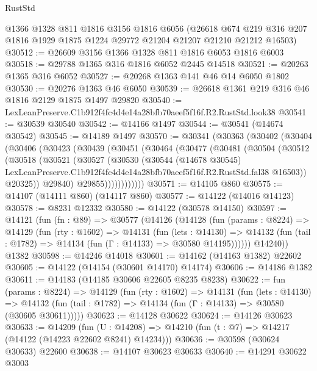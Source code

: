 \begin{lexlean}{RustStd}
\begin{coremodule}
    @1366
    @1328
    @811
    @1816
    @3156
    @1816
    @6056
    (@26618 @674 @219 @316 @207 @1816 @1929 @1875 @1224 @29772 @21204 @21207 @21210 @21212 @16503)
@30512 := @26609 @3156 @1366 @1328 @811 @1816 @6053 @1816 @6003
@30518 := @29788 @1365 @316 @1816 @6052 @2445 @14518
@30521 := @20263 @1365 @316 @6052
@30527 := @20268 @1363 @141 @46 @14 @6050 @1802
@30530 := @20276 @1363 @46 @6050
@30539 := @26618 @1361 @219 @316 @46 @1816 @2129 @1875 @1497 @29820
@30540 := LexLeanPreserve.C1b912f4fc4d4e14a28bfb70aeef5f16f.R2.RustStd.look38
@30541 := @30539 @30540
@30542 := @14166 @1497
@30544 := @30541 (@14674 @30542)
@30545 := @14189 @1497
@30570 := @30341
    (@30363
      (@30402
        (@30404
          (@30406
            (@30423
              (@30439
                (@30451
                  (@30464
                    (@30477
                      (@30481
                        (@30504
                          (@30512
                            (@30518
                              (@30521
                                (@30527
                                  (@30530
                                    (@30544
                                      (@14678 @30545)
                                      LexLeanPreserve.C1b912f4fc4d4e14a28bfb70aeef5f16f.R2.RustStd.fal38
                                      @16503))
                                  @20325))
                              @29840)
                            @29855))))))))))))
@30571 := @14105 @860
@30575 := @14107 (@14111 @860) (@14117 @860)
@30577 := @14122 (@14016 @14123)
@30578 := @8231 @12332
@30580 := @14122 (@30578 @14150)
@30597 := @14121
    (fun (fn : @89) =>
    @30577
      (@14126
        (@14128
          (fun (params : @8224) =>
          @14129
            (fun (rty : @1602) =>
            @14131
              (fun (lets : @14130) =>
              @14132 (fun (tail : @1782) => @14134 (fun (Γ : @14133) => @30580 @14195))))))
        @14240))
    @1382
@30598 := @14246 @14018
@30601 := @14162 (@14163 @1382) @22602
@30605 := @14122 (@14154 (@30601 @14170) @14174)
@30606 := @14186 @1382
@30611 := @14183 (@14185 @30606 @22605 @8235 @8238)
@30622 := fun (params : @8224) =>
  @14129
    (fun (rty : @1602) =>
    @14131
      (fun (lets : @14130) =>
      @14132 (fun (tail : @1782) => @14134 (fun (Γ : @14133) => @30580 (@30605 @30611)))))
@30623 := @14128 @30622
@30624 := @14126 @30623
@30633 := @14209
    (fun (U : @14208) => @14210 (fun (t : @7) => @14217 (@14122 (@14223 @22602 @8241) @14234)))
@30636 := @30598 (@30624 @30633) @22600
@30638 := @14107 @30623 @30633
@30640 := @14291 @30622 @3003

\end{coremodule}
\end{lexlean}

